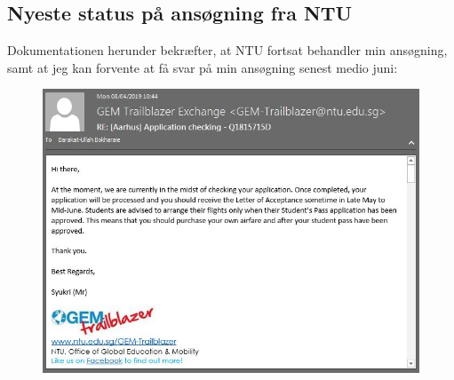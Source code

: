 \documentclass[../Ansoegning.tex]{subfiles}
\begin{document}
\subsection*{Nyeste status på ansøgning fra NTU}
Dokumentationen herunder bekræfter, at NTU fortsat behandler min ansøgning, samt at jeg kan forvente at få svar på min ansøgning senest medio juni:
\begin{figure}[H]
	\centering
	\includegraphics[width=1\textwidth]{Eksterne_filer/dokumentation4.JPG}
\end{figure}
\end{document}
